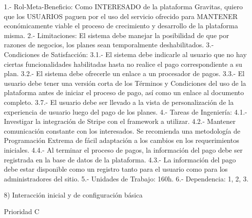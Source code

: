 	1.-	Rol-Meta-Beneficio:	Como INTERESADO de la plataforma Gravitas, quiero que los USUARIOS paguen por el uso del servicio ofrecido para MANTENER económicamente viable el proceso de crecimiento y desarrollo de la plataforma misma.
	2.-	Limitaciones: El sistema debe manejar la posibilidad de que por razones de negocios, los planes sean temporalmente deshabilitados.
	3.-	Condiciones de Satisfacción:
		3.1.-	El sistema debe indicarle al usuario que no hay ciertas funcionalidades habilitadas hasta no realice el pago correspondiente a su plan.
		3.2.- El sistema debe ofrecerle un enlace a un procesador de pagos.
		3.3.-	El usuario debe tener una versión corta de los Términos y Condiciones del uso de la plataforma antes de iniciar el proceso de pago, así como un enlace al documento completo.
		3.7.-	El usuario debe ser llevado a la vista de personalización de la experiencia de usuario luego del pago de los planes.
	4.-	Tareas de Ingeniería:
		4.1.-	Investigar la integración de Stripe con el framework a utilizar.
		4.2.-	Mantener comunicación constante con los interesados. Se recomienda una metodología de Programación Extrema de fácil adaptación a los cambios en los requerimientos iniciales.
		4.4.-	Al terminar el proceso de pagos, la información del pago debe ser registrada en la base de datos de la plataforma.
		4.3.-	La información del pago debe estar disponible como un registro tanto para el usuario como para los administradores del sitio.
	5.-	Unidades de Trabajo: 160h.
	6.- 	Dependencia: 1, 2, 3.


8) Interacción inicial y de configuración básica

	Prioridad C

